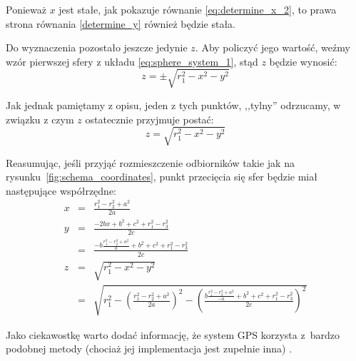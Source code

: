 Ponieważ $x$ jest stałe, jak pokazuje równanie \ref{eq:determine_x_2}, to prawa strona równania \ref{determine_y} również będzie stała.

Do wyznaczenia pozostało jeszcze jedynie $z$. Aby policzyć jego wartość, weźmy wzór pierwszej sfery z układu \ref{eq:sphere_system_1}, stąd $z$ będzie wynosić:
\begin{equation}
 z = \pm\sqrt{r_1^2 - x^2 - y^2}
\end{equation}

Jak jednak pamiętamy z opisu, jeden z tych punktów, ,,tylny'' odrzucamy, w związku z czym $z$ ostatecznie przyjmuje postać:
\begin{equation}
 z = \sqrt{r_1^2 - x^2 - y^2}
\end{equation}

Reasumując, jeśli przyjąć rozmieszczenie odbiorników takie jak na rysunku~\ref{fig:schema_coordinates}, punkt przecięcia się sfer będzie miał następujące współrzędne:
\begin{eqnarray}
 x & = & \frac{r_1^2 - r_2^2 + a^2}{2a} \label{eq:trilateration_final_x}\\
 y & = & \frac{-2bx + b^2 + c^2 + r_1^2 - r_3^2}{2c} \label{eq:trilateration_final_y}\\
   & = & \frac{-b\frac{r_1^2 - r_2^2 + a^2}{a} + b^2 + c^2 + r_1^2 - r_3^2}{2c} \nonumber \\
 z & = & \sqrt{r_1^2 - x^2 - y^2} \label{eq:trilateration_final_z}\\
   & = & \sqrt{r_1^2 - \left(\frac{r_1^2 - r_2^2 + a^2}{2a}\right)^2 - \left(\frac{b\frac{r_1^2 - r_2^2 + a^2}{-a} + b^2 + c^2 + r_1^2 - r_3^2}{2c}\right)^2} \nonumber
\end{eqnarray}

Jako ciekawostkę warto dodać informację, że system \textsc{GPS} korzysta z~bardzo podobnej metody (chociaż jej implementacja jest zupełnie inna) \citep{MioGps}.
